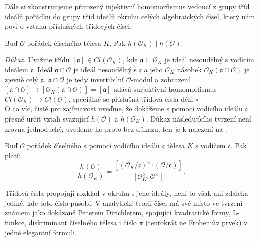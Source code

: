 \documentclass [12pt]{report}
\begin{document}
Dále si zkonstruujeme přirozený injektivní homomorfismus vedoucí z grupy tříd ideálů pořádku do grupy tříd ideálů okruhu celých algebraických čísel, který nám poví o vztahů příslušných třídových čísel. 

\begin{veta}
Buď $\mathcal{O}$ pořádek číselného tělesa $K$. Pak $h(\mathcal{O}_K) \mid h(\mathcal{O})$.
\end{veta}
\noindent \textit{Důkaz.} Uvažme třídu $[\mathfrak{a}] \in Cl(\mathcal{O}_K)$, kde $\mathfrak{a} \subseteq \mathcal{O}_K$ je ideál nesoudělný s vodícím ideálem $\mathfrak{c}$. Ideál $\mathfrak{a} \cap \mathcal{O}$ je ideál nesoudělný s $\mathfrak{c}$ a jeho $\mathcal{O}_K$ násobek $\mathcal{O}_K (\mathfrak{a} \cap \mathcal{O})$ je zjevně celý $\mathfrak{a}$, $\mathfrak{a} \cap \mathcal{O}$ je tedy invertibilní $\mathcal{O}$-modul a zobrazení $[\mathfrak{a} \cap \mathcal{O}] \rightarrow [\mathcal{O}_K (\mathfrak{a} \cap \mathcal{O})]= [\mathfrak{a}]$ udává surjektivní homomorfismus $Cl(\mathcal{O}_K) \longrightarrow Cl(\mathcal{O})$, speciálně se příslušná třídová čísla dělí. \hfill $\square$\\
 
O co víc, čistě pro zajímavost uveďme, že dokážeme  s pomocí vodícího ideálu $\mathfrak{c}$ přesně určit vztah svazující $h(\mathcal{O})$ a $h(\mathcal{O}_K)$. Důkaz následujícího tvrzení není zrovna jednoduchý, uvedeme ho proto bez důkazu, ten je k nalezení na \cite[Thm. 5.2.]{Conrad3}.
\begin{veta} 
Buď $\mathcal{O}$ pořádek číselného s pomocí vodícího ideálu $\mathfrak{c}$ tělesa $K$ s vodičem $\mathfrak{c}$. Pak platí:
\begin{equation*}
\frac{h(\mathcal{O})}{h(\mathcal{O}_K)} = \frac{[(\mathcal{O}_K/\mathfrak{c})^{\times} : (\mathcal{O}/\mathfrak{c})]}{[\mathcal{O}_K ^\times : \mathcal{O}^\times]}.
\end{equation*}
\end{veta}

Třídová čísla propojují rozklad v okruhu s jeho ideály, není to však ani zdaleka jediné, kde toto číslo působí. V analytické teorii čísel má své místo ve tvrzení známem jako  dokázané Peterem Dirichletem, spojující kvadratické formy, L-funkce, diskriminant číselného tělesa i číslo $\pi$ (tentokrát ne Frobeniův prvek) v jedné elegantní formuli.
 
 
\end{document}
